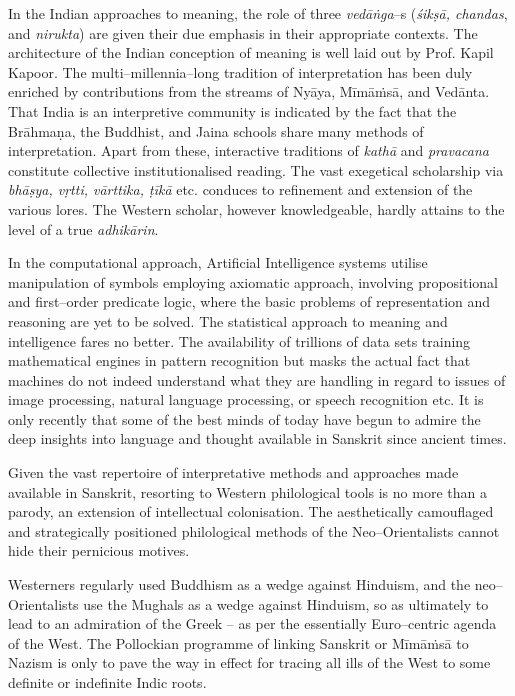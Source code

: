 In the Indian approaches to meaning, the role of three \textit{vedāṅga}–s (\textit{śikṣā, chandas}, and \textit{nirukta}) are given their due emphasis in their appropriate contexts. The architecture of the Indian conception of meaning is well laid out by Prof. Kapil Kapoor. The multi–millennia–long tradition of interpretation has been duly enriched by contributions from the streams of Nyāya, Mīmāṁsā, and Vedānta. That India is an interpretive community is indicated by the fact that the Brāhmaṇa, the Buddhist, and Jaina schools share many methods of interpretation. Apart from these, interactive traditions of \textit{kathā} and \textit{pravacana} constitute collective institutionalised reading. The vast exegetical scholarship via \textit{bhāṣya, vṛtti, vārttika, ṭīkā} etc. conduces to refinement and extension of the various lores. The Western scholar, however knowledgeable, hardly attains to the level of a true \textit{adhikārin}.

In the computational approach, Artificial Intelligence systems utilise manipulation of symbols employing axiomatic approach, involving propositional and first–order predicate logic, where the basic problems of representation and reasoning are yet to be solved. The statistical approach to meaning and intelligence fares no better. The availability of trillions of data sets training mathematical engines in pattern recognition but masks the actual fact that machines do not indeed understand what they are handling in regard to issues of image processing, natural language processing, or speech recognition etc. It is only recently that some of the best minds of today have begun to admire the deep insights into language and thought available in Sanskrit since ancient times.

Given the vast repertoire of interpretative methods and approaches made available in Sanskrit, resorting to Western philological tools is no more than a parody, an extension of intellectual colonisation. The aesthetically camouflaged and strategically positioned philological methods of the Neo–Orientalists cannot hide their pernicious motives.

Westerners regularly used Buddhism as a wedge against Hinduism, and the neo–Orientalists use the Mughals as a wedge against Hinduism, so as ultimately to lead to an admiration of the Greek – as per the essentially Euro–centric agenda of the West. The Pollockian programme of linking Sanskrit or Mīmāṁsā to Nazism is only to pave the way in effect for tracing all ills of the West to some definite or indefinite Indic roots.

